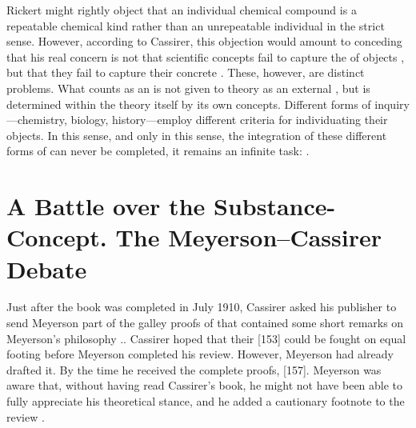 \documentclass[submitted,12pt]{article}
\begin{document}
Rickert might rightly object that an individual chemical compound is a repeatable chemical kind rather than an unrepeatable individual in the strict sense. However, according to Cassirer, this objection would amount to conceding that his real concern is not that scientific concepts fail to capture the  of objects , but that they fail to capture their concrete   . These, however, are distinct problems. What counts as an  is not given to theory as an external , but is determined within the theory itself by its own  concepts. Different forms of inquiry---chemistry, biology, history---employ different criteria for individuating their objects. In this sense, and only in this sense, the integration of these different forms of  can never be completed, it remains an infinite task:  .

 
\section{A  Battle over the Substance-Concept. The Meyerson--Cassirer Debate}
\label{sec:meyerson}
%
Just after the book was completed in July 1910, Cassirer asked his publisher to send Meyerson part of the galley proofs of \SFt that contained some short remarks on Meyerson's philosophy .. Cassirer hoped that their  [153] could be fought on equal footing before Meyerson completed his review. However, Meyerson had already drafted it. By the time he received the complete proofs,  [157]. Meyerson was aware that, without having read Cassirer’s book, he might not have been able to fully appreciate his theoretical stance, and he added a cautionary footnote to the review \citep[123]{Meyerson1911}.
\end{document}
